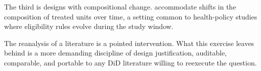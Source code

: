\documentclass[11pt]{article}
\begin{document}
The third is designs with compositional change. \textcite{sant2026difference} accommodate shifts in the composition of treated units over time, a setting common to health-policy studies where eligibility rules evolve during the study window.

The reanalysis of a literature is a pointed intervention. What this exercise leaves behind is a more demanding discipline of design justification, auditable, comparable, and portable to any DiD literature willing to reexecute the question.


\printbibliography[heading=bibintoc,title={References}]


\appendix





\end{document}
